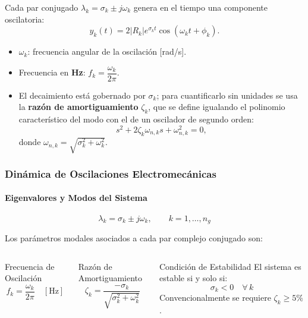 \documentclass{beamer}
\begin{document}
\begin{frame}

Cada par conjugado $\lambda_k = \sigma_k \pm j\omega_k$ genera en el tiempo
una componente oscilatoria:
\[
y_k(t) = 2|R_k| e^{\sigma_k t} \cos(\omega_k t + \phi_k).
\]
\begin{itemize}
    \item $\omega_k$: frecuencia angular de la oscilación [rad/s].
    \item Frecuencia en \textbf{Hz}: $f_k = \dfrac{\omega_k}{2\pi}$.
    \item El decaimiento está gobernado por $\sigma_k$; para cuantificarlo
          sin unidades se usa la \textbf{razón de amortiguamiento} $\zeta_k$,
          que se define igualando el polinomio característico del modo con
          el de un oscilador de segundo orden:
          \[
          s^2 + 2\zeta_k\omega_{n,k} s + \omega_{n,k}^2 = 0,
          \]
          donde $\omega_{n,k} = \sqrt{\sigma_k^2+\omega_k^2}$.
          
\end{itemize}
\end{frame}

\begin{frame}
\frametitle{Dinámica de Oscilaciones Electromecánicas}
\framesubtitle{Eigenvalores y Modos del Sistema}


\begin{equation}
    \lambda_k = \sigma_k \pm j\omega_k, \qquad k = 1,\ldots,n_g
    \label{eq:eigenvalue}
\end{equation}

Los parámetros modales asociados a cada par complejo conjugado son:

\begin{columns}
\begin{block}{Frecuencia de Oscilación}
\begin{equation}
    f_k = \frac{\omega_k}{2\pi} \quad [\text{Hz}]
    \label{eq:freq}
\end{equation}
\end{block}
\begin{block}{Razón de Amortiguamiento}
\begin{equation}
    \zeta_k = \frac{-\sigma_k}{\sqrt{\sigma_k^2 + \omega_k^2}}
    \label{eq:damp}
\end{equation}
\end{block}

\begin{alertblock}{Condición de Estabilidad}
    El sistema es estable si y solo si:
    \begin{equation}
        \sigma_k < 0 \quad \forall\, k
        \label{eq:stability}
    \end{equation}
    Convencionalmente se requiere $\zeta_k \geq 5\%$.
\end{alertblock}
\end{columns}

\end{frame}
\end{document}

